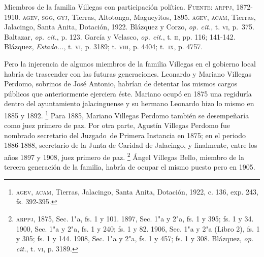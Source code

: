 \documentclass[14pt,twoside,final]{extbook} %
\let\oldfootnote\footnote
\renewcommand\footnote[1]{%
\oldfootnote{\hspace{1mm}#1}}
\begin{document}
\begin{table}
\begin{small}
\end{small}
\caption[Miembros de la familia Villegas con participación política]{Miembros de la familia Villegas con participación política. \textsc{Fuente:} \textsc{arppj}, 1872-1910. \textsc{agev, sgg, gyj}, Tierras, Altotonga, Magueyitos, 1895. \textsc{agev, acam}, Tierras, Jalacingo, Santa Anita, Dotación, 1922. Blázquez y Corzo, \emph{op. cit.}, t. \textsc{vi}, p.~375. Baltazar, \emph{op. cit.}, p. 123. García y Velasco, \emph{op. cit.}, t. \textsc{ii}, pp. 116; 141-142. Blázquez, \emph{Estado...}, t. \textsc{vi}, p. 3189; t. \textsc{viii}, p. 4404; t.~\textsc{ix}, p. 4757.}
\label{tab:villegas-politica}
\end{table}

Pero la injerencia de algunos miembros de la familia Villegas en el gobierno local habría de trascender con las futuras generaciones. Leonardo y Mariano Villegas Perdomo, sobrinos de José Antonio, habrían de detentar los mismos cargos públicos que anteriormente ejerciera éste. Mariano ocupó en 1875 una regiduría dentro del ayuntamiento jalacinguense y su hermano Leonardo hizo lo mismo en 1885 y 1892.\footnote{\textsc{agev, acam}, Tierras, Jalacingo, Santa Anita, Dotación, 1922, c. 136, exp. 243, fs. 392-395.} Para 1885, Mariano Villegas Perdomo también se desempeñaría como juez primero de paz. Por otra parte, Agustín Villegas Perdomo fue nombrado secretario del Juzgado~de Primera Instancia en 1875; en el periodo 1886-1888, secretario de la Junta de Caridad de Jalacingo, y finalmente, entre los años 1897 y 1908, juez primero de paz.\footnote{\textsc{arppj}, 1875, Sec. 1"a, fs. 1 y 101. 1897, Sec. 1"a y 2"a, fs. 1 y 395; fs. 1 y 34. 1900, Sec. 1"a y 2"a, fs. 1 y 240; fs. 1 y 82. 1906, Sec. 1"a y 2"a (Libro 2), fs. 1 y 305; fs. 1 y 144. 1908, Sec. 1"a y 2"a, fs. 1 y 457; fs. 1 y 308. Blázquez, \emph{op. cit.}, t. \textsc{vi}, p. 3189.} Ángel Villegas Bello, miembro de la tercera generación de la familia, habría de ocupar el mismo puesto pero en 1905.
\end{document}
